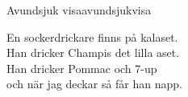 \begin{song}{Avundsjuk visa}{avundsjukvisa}
\begin{vers}
En sockerdrickare finns på kalaset.\\
Han dricker Champis det lilla aset.\\
Han dricker Pommac och 7-up\\
och när jag deckar så får han napp.\\
\end{vers}
\end{song}
